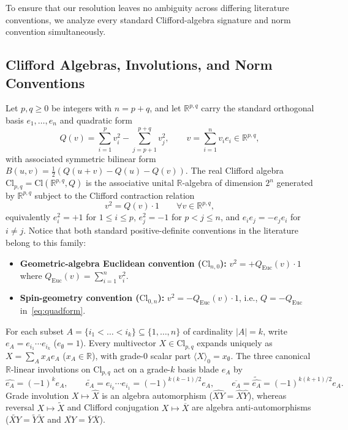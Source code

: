 \documentclass[11pt]{article}
\theoremstyle{definition}
\newcommand{\Cl}{\mathrm{Cl}}
\newcommand{\R}{\mathbb{R}}
\begin{document}
To ensure that our resolution leaves no ambiguity across differing literature conventions, we analyze every standard Clifford-algebra signature and norm convention simultaneously.

\subsection{Clifford Algebras, Involutions, and Norm Conventions}

Let $p,q\ge 0$ be integers with $n=p+q$, and let $\R^{p,q}$ carry the standard orthogonal basis $e_1,\dots,e_n$ and quadratic form
\begin{equation}\label{eq:quadform}
  Q(v) = \sum_{i=1}^{p} v_i^2 - \sum_{j=p+1}^{p+q} v_j^2, \qquad v = \sum_{i=1}^{n} v_i e_i \in \R^{p,q},
\end{equation}
with associated symmetric bilinear form $B(u,v)=\frac{1}{2}(Q(u+v)-Q(u)-Q(v))$. The real Clifford algebra $\Cl_{p,q}=\Cl(\R^{p,q},Q)$ is the associative unital $\R$-algebra of dimension $2^n$ generated by $\R^{p,q}$ subject to the Clifford contraction relation
\begin{equation}\label{eq:contraction}
  v^2 = Q(v)\cdot 1 \qquad \forall v\in\R^{p,q},
\end{equation}
equivalently $e_i^2=+1$ for $1\le i\le p$, $e_j^2=-1$ for $p<j\le n$, and $e_ie_j=-e_je_i$ for $i\ne j$. Notice that both standard positive-definite conventions in the literature belong to this family:
\begin{itemize}
  \item \textbf{Geometric-algebra Euclidean convention ($\Cl_{n,0}$):} $v^2=+Q_{\mathrm{Euc}}(v)\cdot 1$ where $Q_{\mathrm{Euc}}(v)=\sum_{i=1}^n v_i^2$.
  \item \textbf{Spin-geometry convention ($\Cl_{0,n}$):} $v^2=-Q_{\mathrm{Euc}}(v)\cdot 1$, i.e., $Q=-Q_{\mathrm{Euc}}$ in~\eqref{eq:quadform}.
\end{itemize}

For each subset $A=\{i_1<\dots<i_k\}\subseteq\{1,\dots,n\}$ of cardinality $|A|=k$, write $e_A=e_{i_1}\cdots e_{i_k}$ ($e_\emptyset=1$). Every multivector $X\in\Cl_{p,q}$ expands uniquely as $X=\sum_A x_A e_A$ ($x_A\in\R$), with grade-$0$ scalar part $\langle X\rangle_0=x_\emptyset$. The three canonical $\R$-linear involutions on $\Cl_{p,q}$ act on a grade-$k$ basis blade $e_A$ by
\begin{equation}\label{eq:involutions}
  \widehat{e_A} = (-1)^k e_A, \qquad
  \widetilde{e_A} = e_{i_k}\cdots e_{i_1} = (-1)^{k(k-1)/2} e_A, \qquad
  \overline{e_A} = \widetilde{\widehat{e_A}} = (-1)^{k(k+1)/2} e_A.
\end{equation}
Grade involution $X\mapsto\widehat{X}$ is an algebra automorphism ($\widehat{XY}=\widehat{X}\widehat{Y}$), whereas reversal $X\mapsto\widetilde{X}$ and Clifford conjugation $X\mapsto\overline{X}$ are algebra anti-automorphisms ($\widetilde{XY}=\widetilde{Y}\widetilde{X}$ and $\overline{XY}=\overline{Y}\overline{X}$).
\end{document}
